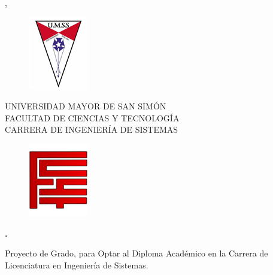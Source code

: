 \begin{center}

\end{center}
\vfill

\begin{center}
\Large{\mes, \yeaR}
\end{center}

\thispagestyle{empty}

\newpage
\begin{center}
		\begin{figure}[h]
			\raggedright
			\includegraphics[scale=0.9]{imagenes/umss.png}

		\end{figure}

{\renewcommand{\baselinestretch}{1}
\LARGE{UNIVERSIDAD MAYOR DE SAN SIMÓN}\\\Large{FACULTAD DE CIENCIAS Y TECNOLOGÍA\\CARRERA DE INGENIERÍA DE SISTEMAS}

}
		\begin{figure}[h]
			\raggedleft
			\includegraphics[scale=0.9]{imagenes/fcyt.png}

		\end{figure}

\vspace{25mm}

\Large{\textbf{\titulo.}}
\vspace{20mm}


\Large{\textbf{\alumnos}}
\vspace{20mm}

\large{Proyecto de Grado, para Optar al Diploma Académico en la Carrera de Licenciatura en Ingeniería de Sistemas.}

\end{center}
\vspace{14mm}

